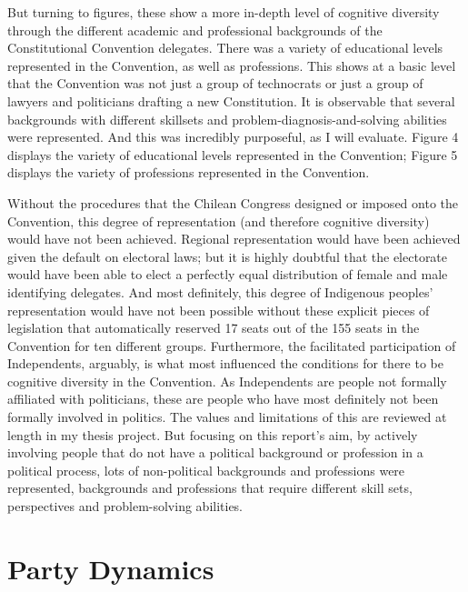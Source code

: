 \documentclass[
  man]{apa6}
\begin{document}
But turning to figures, these show a more in-depth level of cognitive diversity through the different academic and professional backgrounds of the Constitutional Convention delegates. There was a variety of educational levels represented in the Convention, as well as professions. This shows at a basic level that the Convention was not just a group of technocrats or just a group of lawyers and politicians drafting a new Constitution. It is observable that several backgrounds with different skillsets and problem-diagnosis-and-solving abilities were represented. And this was incredibly purposeful, as I will evaluate. Figure 4 displays the variety of educational levels represented in the Convention; Figure 5 displays the variety of professions represented in the Convention.

Without the procedures that the Chilean Congress designed or imposed onto the Convention, this degree of representation (and therefore cognitive diversity) would have not been achieved. Regional representation would have been achieved given the default on electoral laws; but it is highly doubtful that the electorate would have been able to elect a perfectly equal distribution of female and male identifying delegates. And most definitely, this degree of Indigenous peoples' representation would have not been possible without these explicit pieces of legislation that automatically reserved 17 seats out of the 155 seats in the Convention for ten different groups. Furthermore, the facilitated participation of Independents, arguably, is what most influenced the conditions for there to be cognitive diversity in the Convention. As Independents are people not formally affiliated with politicians, these are people who have most definitely not been formally involved in politics. The values and limitations of this are reviewed at length in my thesis project. But focusing on this report's aim, by actively involving people that do not have a political background or profession in a political process, lots of non-political backgrounds and professions were represented, backgrounds and professions that require different skill sets, perspectives and problem-solving abilities.

\hypertarget{party-dynamics}{%
\section{Party Dynamics}\label{party-dynamics}}
\end{document}
